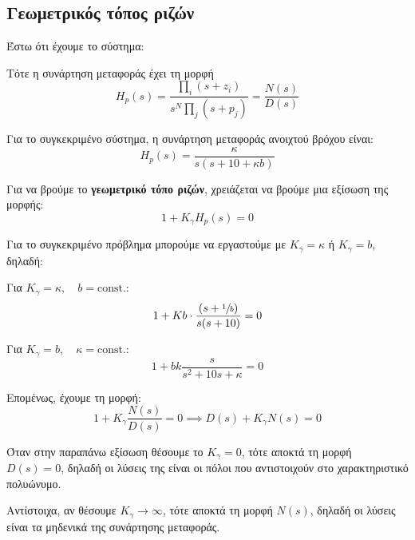 \documentclass[11pt,a4paper,notitlepage,fleqn,final]{article}
\begin{document}
\subsection{Γεωμετρικός τόπος ριζών}
Έστω ότι έχουμε το σύστημα:


Τότε η συνάρτηση μεταφοράς έχει τη μορφή
\[
H_p(s) = \frac{\prod_{i}(s+z_i)}{s^N \prod_j (s+p_j)}
= \frac{N(s)}{D(s)}
\]

Για το συγκεκριμένο σύστημα, η συνάρτηση μεταφοράς ανοιχτού βρόχου
είναι:
\[
H_p(s) = \frac{κ}{s(s+10+κb)}
\]

Για να βρούμε το \textbf{γεωμετρικό τόπο ριζών}, χρειάζεται να
βρούμε μια εξίσωση της μορφής:
\[
\boxed{1+ K_\gamma H_p(s) = 0}
\]

Για το συγκεκριμένο πρόβλημα μπορούμε να εργαστούμε με \( K_γ = κ \)
ή \( Κ_\gamma = b \), δηλαδή:
\begin{enumgreekparen}
	\item Για \( K_γ = κ,\quad b=\mathrm{const.} \):
	\[
	1 + Kb \cdot \frac{(s+\sfrac{1}{b} )}{s(s+10)} = 0
	\]
	\item Για \( K_γ = b,\quad κ=\mathrm{const.}\):
	\[
	1 + bk \frac{s}{s^2+10s+κ} = 0
	\]
\end{enumgreekparen}


Επομένως, έχουμε τη μορφή:
\[
1+K_γ\frac{N(s)}{D(s)} = 0
\implies
D(s) + K_γN(s) = 0
\]

Όταν στην παραπάνω εξίσωση θέσουμε το \( K_γ = 0 \), τότε αποκτά
τη μορφή \( D(s) = 0\), δηλαδή οι λύσεις της είναι οι πόλοι που αντιστοιχούν
στο χαρακτηριστικό πολυώνυμο.

Αντίστοιχα, αν θέσουμε \( Κ_γ \to \infty \), τότε αποκτά τη μορφή
\( N(s) \), δηλαδή οι λύσεις είναι τα μηδενικά της συνάρτησης μεταφοράς.
\end{document}
